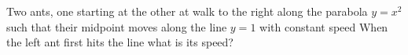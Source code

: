 Two ants, one starting at  the other at  walk to the right along the parabola $ y = x^2 $ such that their midpoint moves along the line $ y = 1 $ with constant speed  When the left ant first hits the line  what is its speed?